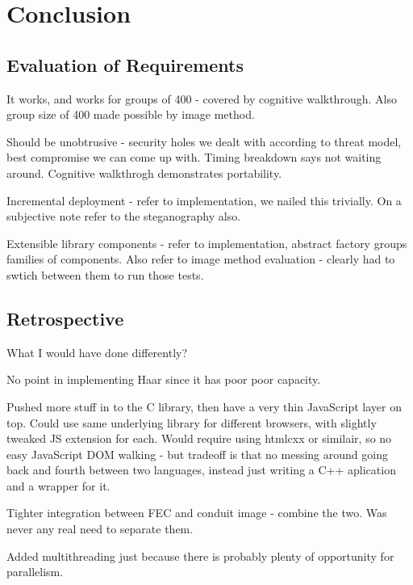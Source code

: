\chapter{Conclusion}\label{ch:conclusion}

\section{Evaluation of Requirements}
\label{sec:eval-require}


It works, and works for groups of 400 - covered by cognitive walkthrough. Also group size of 400 made possible by image method.

Should be unobtrusive - security holes we dealt with according to threat model, best compromise we can come up with. Timing breakdown says not waiting around. Cognitive walkthrogh demonstrates portability.

Incremental deployment - refer to implementation, we nailed this trivially. On a subjective note refer to the steganography also.

Extensible library components - refer to implementation, abstract factory groups families of components. Also refer to image method evaluation - clearly had to swtich between them to run those tests.

\section{Retrospective}
\label{sec:retro}

What I would have done differently?

No point in implementing Haar since it has poor poor capacity.

Pushed more stuff in to the C library, then have a very thin JavaScript layer on top. Could use same underlying library for different browsers, with slightly tweaked JS extension for each. Would require using htmlcxx or similair, so no easy JavaScript DOM walking - but tradeoff is that no messing around going back and fourth between two languages, instead just writing a C++ aplication and a wrapper for it.

Tighter integration between FEC and conduit image - combine the two. Was never any real need to separate them.

Added multithreading just because there is probably plenty of opportunity for parallelism.



